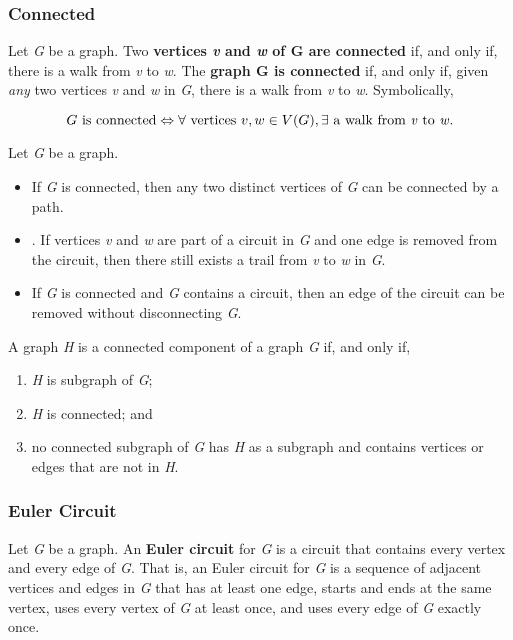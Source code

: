 \documentclass{article}
\begin{document}
\subsubsection{Connected}
Let \textit{G} be a graph. Two \textbf{vertices \textit{v} and \textit{w} of G are connected} if, and only if, there is a walk from \textit{v} to \textit{w}. The \textbf{graph G is connected} if, and only if, given \textit{any} two vertices \textit{v} and \textit{w} in \textit{G}, there is a walk from \textit{v} to \textit{w}. Symbolically,

\begin{equation}
G \ \text{is connected} \Leftrightarrow \forall \ \text{vertices} \ v, w \in V(G), \exists \ \text{a walk from \textit{v} to \textit{w}}.
\end{equation}

Let \textit{G} be a graph.
\begin{itemize}
\item If \textit{G} is connected, then any two distinct vertices of \textit{G} can be connected by a path.
\item . If vertices \textit{v} and \textit{w} are part of a circuit in \textit{G} and one edge is removed from the circuit, then there still exists a trail from \textit{v} to \textit{w} in \textit{G}.
\item If \textit{G} is connected and \textit{G} contains a circuit, then an edge of the circuit can be removed without disconnecting \textit{G}.
\end{itemize}

A graph \textit{H} is a connected component of a graph \textit{G} if, and only if,
\begin{enumerate}
\item \textit{H} is subgraph of \textit{G};
\item \textit{H} is connected; and
\item no connected subgraph of \textit{G} has \textit{H} as a subgraph and contains vertices or edges that are not in \textit{H}.
\end{enumerate}

\subsubsection{Euler Circuit}
Let \textit{G} be a graph. An \textbf{Euler circuit} for \textit{G} is a circuit that contains every vertex and every edge of \textit{G}. That is, an Euler circuit for \textit{G} is a sequence of adjacent vertices and edges in \textit{G} that has at least one edge, starts and ends at the same vertex, uses every vertex of \textit{G} at least once, and uses every edge of \textit{G} exactly once.
\end{document}
